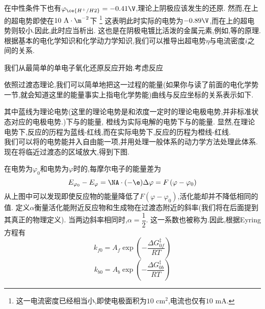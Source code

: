 \documentclass{ctexart}
\begin{document}
在中性条件下也有$\varphi_{\ce{H^+/H2}}=-0.41\V$,理论上阴极应该发生的还原.%
然而,在上的超电势即使在$10\text{ A}\cdot\m^{-2}$下%
\footnote{这一电流密度已经相当小,即使电极面积为$10\text{ cm}^2$,电流也仅有$10\text{ mA}$.}%
这表明此时实际的电势为$-0.89\V$,而在上的超电势则较小.因此,此时应当析出.%
这也是在阴极电镀比活泼的金属元素,例如,等的原理.\vspace{12pt}\\
\indent 根据基本的电化学知识和化学动力学知识,我们可以推导出超电势$\eta$与电流密度$i$之间的关系.
\begin{derivation}
    我们从最简单的单电子氧化还原反应开始.考虑反应
    \begin{tightcenter}
    \end{tightcenter}
    依照过渡态理论,我们可以简单地把这一过程的能量(如果你与读了前面的电化学势一节,就会知道这里的能量事实上指电化学势能)曲线与反应坐标的关系表示如下.
    \begin{center}
        
    \end{center}
    其中蓝线为理论电势(这里的理论电势是和浓度一定时的理论电极电势,并非标准状态对应的电极电势.)下与的能量,%
    橙线为实际电解的电势下与的能量.%
    显然,在理论电势下,反应的历程为蓝线-红线,而在实际电势下,反应的历程为橙线-红线.\\
    我们可以将的电势能并入自由能一项,并用处理一般体系的动力学方法处理此体系.\\
    现在将临近过渡态的区域放大,得到下图.
    \begin{center}
        
    \end{center}
    在电势为$\varphi_0$和电势为$\varphi$时的,每摩尔电子的能量差为
    \[E_{\varphi_0}-E_{\varphi}=\NA\cdot(-\e)\Delta\varphi=F\left(\varphi-\varphi_0\right)\]
    从上图中可以发现即使反应物的能量降低了$F\left(\varphi-\varphi_0\right)$,活化能却并不降低相同的值.%
    定义$\alpha$衡量活化能附近反应物和生成物在过渡态附近的斜率(我们将在后面提到其真正的物理定义).%
    当两边斜率相同时,$\alpha=\dfrac12$.%
    这一系数也被称为.因此,根据Eyring方程有
    \[k_{f0}=A_f\exp\left(-\dfrac{\Delta G_{0f}^\ddagger}{RT}\right)\]
    \[k_{b0}=A_b\exp\left(-\dfrac{\Delta G_{0b}^\ddagger}{RT}\right)\]

\end{derivation}
\end{document}
